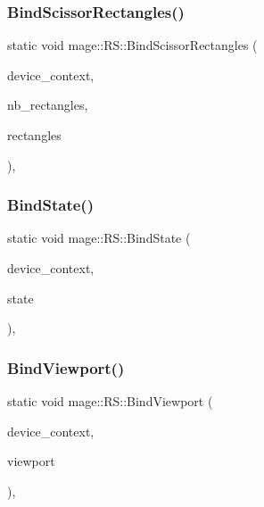 \hypertarget{structmage_1_1_r_s_aef6f6eca8780c0be18af2b55d93f7c05}{}\label{structmage_1_1_r_s_aef6f6eca8780c0be18af2b55d93f7c05} 
\subsubsection{\texorpdfstring{Bind\+Scissor\+Rectangles()}{BindScissorRectangles()}}
{\footnotesize\ttfamily static void mage\+::\+R\+S\+::\+Bind\+Scissor\+Rectangles (\begin{DoxyParamCaption}\item[{I\+D3\+D11\+Device\+Context2 $\ast$}]{device\+\_\+context,  }\item[{U\+I\+NT}]{nb\+\_\+rectangles,  }\item[{const D3\+D11\+\_\+\+R\+E\+CT $\ast$}]{rectangles }\end{DoxyParamCaption})\hspace{0.3cm}{\ttfamily [static]}, {\ttfamily [noexcept]}}

\hypertarget{structmage_1_1_r_s_a62fcfb14eb7466822b2633cb30603036}{}\label{structmage_1_1_r_s_a62fcfb14eb7466822b2633cb30603036} 
\subsubsection{\texorpdfstring{Bind\+State()}{BindState()}}
{\footnotesize\ttfamily static void mage\+::\+R\+S\+::\+Bind\+State (\begin{DoxyParamCaption}\item[{I\+D3\+D11\+Device\+Context2 $\ast$}]{device\+\_\+context,  }\item[{I\+D3\+D11\+Rasterizer\+State $\ast$}]{state }\end{DoxyParamCaption})\hspace{0.3cm}{\ttfamily [static]}, {\ttfamily [noexcept]}}

\hypertarget{structmage_1_1_r_s_a094b7a816b146971b2489fe43a7c1411}{}\label{structmage_1_1_r_s_a094b7a816b146971b2489fe43a7c1411} 
\subsubsection{\texorpdfstring{Bind\+Viewport()}{BindViewport()}}
{\footnotesize\ttfamily static void mage\+::\+R\+S\+::\+Bind\+Viewport (\begin{DoxyParamCaption}\item[{I\+D3\+D11\+Device\+Context2 $\ast$}]{device\+\_\+context,  }\item[{const D3\+D11\+\_\+\+V\+I\+E\+W\+P\+O\+RT $\ast$}]{viewport }\end{DoxyParamCaption})\hspace{0.3cm}{\ttfamily [static]}, {\ttfamily [noexcept]}}

